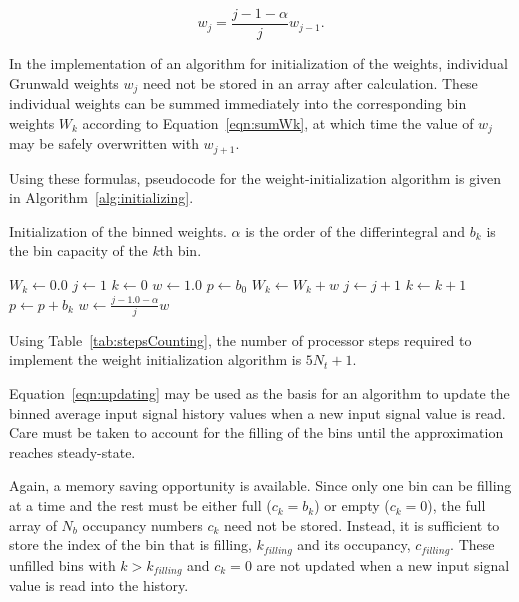 \begin{equation}
w_j = \frac{j-1-\alpha}{j}w_{j-1}.
\label{eqn:GrunwaldRecursion}
\end{equation}

In the implementation of an algorithm for initialization of the
weights, individual Grunwald weights $w_j$ need not be stored in an
array after calculation. These individual weights can be summed
immediately into the corresponding bin weights $W_k$ according to
Equation~\ref{eqn:sumWk}, at which time the value of $w_j$ may be safely
overwritten with $w_{j+1}$.

Using these formulas, pseudocode for the weight-initialization
algorithm is given in Algorithm~\ref{alg:initializing}.

\begin{algorithm}
\caption{Initialization of the binned weights. $\alpha$ is the order of the differintegral and $b_k$ is the bin capacity of the $k$th bin.}
\label{alg:initializing}
\begin{algorithmic}
\STATE $W_k \gets 0.0$
\ENDFOR
\STATE $j \gets 1$
\STATE $k \gets 0$
\STATE $w \gets 1.0$
\STATE $p \gets b_0$
\STATE $W_k \gets W_k + w$
\STATE $j \gets j +1$
\STATE $k \gets k +1$
\STATE $p \gets p +b_k$
\ENDIF
\STATE $w \gets \frac{j-1.0-\alpha}{j}w$
\ENDWHILE
\end{algorithmic}
\end{algorithm}
Using Table~\ref{tab:stepsCounting}, the number of processor steps
required to implement the weight initialization algorithm is $5N_t+1$.

\smallskip

Equation~\ref{eqn:updating} may be used as the basis for an algorithm
to update the binned average input signal history values when a new
input signal value is read. Care must be taken to account for the
filling of the bins until the approximation reaches steady-state.

Again, a memory saving opportunity is available. Since only one bin
can be filling at a time and the rest must be either full ($c_k=b_k$)
or empty ($c_k=0$), the full array of $N_b$ occupancy numbers $c_k$
need not be stored. Instead, it is sufficient to store the index of
the bin that is filling, $k_{filling}$ and its occupancy,
$c_{filling}$. These unfilled bins with $k>k_{filling}$ and $c_k=0$
are not updated when a new input signal value is read into the
history.

